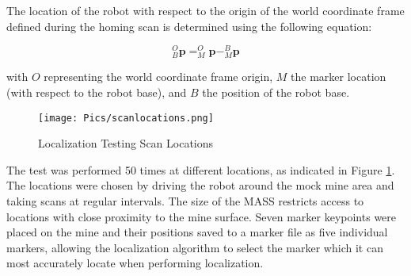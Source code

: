 The location of the robot with respect to the origin of the world coordinate frame defined during the homing scan is determined using the following equation:

\begin{equation*}
^O_B\mathbf{p} = ^O_M\mathbf{p} - ^B_M\mathbf{p}
\end{equation*}

with $O$ representing the world coordinate frame origin, $M$ the marker location (with respect to the robot base), and $B$ the position of the robot base.\\

\begin{figure}
    \centering
    \texttt{[image: Pics/scanlocations.png]}
    \caption{Localization Testing Scan Locations}
    \label{fig:scanlocations}
\end{figure}

The test was performed 50 times at different locations, as indicated in Figure \ref{fig:scanlocations}. The locations were chosen by driving the robot around the mock mine area and taking scans at regular intervals. The size of the MASS restricts access to locations with close proximity to the mine surface. Seven marker keypoints were placed on the mine and their positions saved to a marker file as five individual markers, allowing the localization algorithm to select the marker which it can most accurately locate when performing localization.\\

